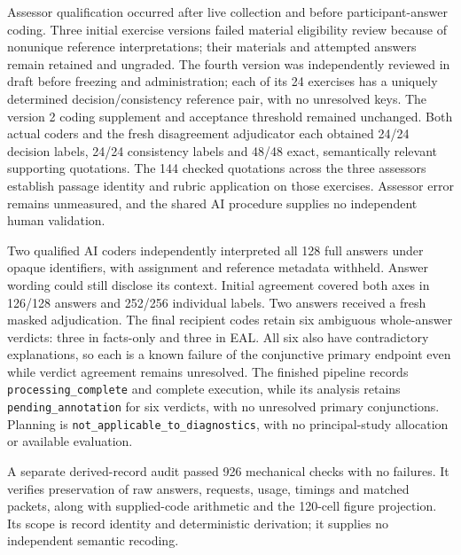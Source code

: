\documentclass[preprint,11pt]{elsarticle}
\begin{document}
Assessor qualification occurred after live collection and before
participant-answer coding. Three initial exercise versions failed
material eligibility review because of nonunique reference
interpretations; their materials and attempted answers remain retained
and ungraded. The fourth version was independently reviewed in draft
before freezing and administration; each of its 24 exercises has a
uniquely determined decision/consistency reference pair, with no
unresolved keys. The version 2 coding supplement and acceptance
threshold remained unchanged. Both actual coders and the fresh
disagreement adjudicator each obtained 24/24 decision labels, 24/24
consistency labels and 48/48 exact, semantically relevant supporting
quotations. The 144 checked quotations across the three assessors
establish passage identity and rubric application on those exercises.
Assessor error remains unmeasured, and the shared AI procedure supplies
no independent human validation.

Two qualified AI coders independently interpreted all 128 full answers
under opaque identifiers, with assignment and reference metadata
withheld. Answer wording could still disclose its context. Initial
agreement covered both axes in 126/128 answers and 252/256 individual
labels. Two answers received a fresh masked adjudication. The final
recipient codes retain six ambiguous whole-answer verdicts: three in
facts-only and three in EAL. All six also have contradictory
explanations, so each is a known failure of the conjunctive primary
endpoint even while verdict agreement remains unresolved. The finished
pipeline records \texttt{processing\_complete} and complete execution,
while its analysis retains \texttt{pending\_annotation} for six
verdicts, with no unresolved primary conjunctions. Planning is
\texttt{not\_applicable\_to\_diagnostics}, with no principal-study
allocation or available evaluation.

A separate derived-record audit passed 926 mechanical checks with no
failures. It verifies preservation of raw answers, requests, usage,
timings and matched packets, along with supplied-code arithmetic and the
120-cell figure projection. Its scope is record identity and
deterministic derivation; it supplies no independent semantic recoding.
\end{document}
